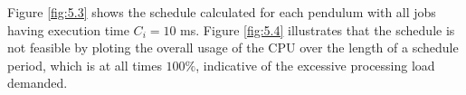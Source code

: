 Figure \ref{fig:5.3} shows the schedule calculated for each pendulum with all
jobs having execution time $C_i = 10$ ms.  Figure \ref{fig:5.4} illustrates that
the schedule is not feasible by ploting the overall usage of the CPU over the
length of a schedule period, which is at all times $100\%$, indicative of the
excessive processing load demanded.


\noindent{}
